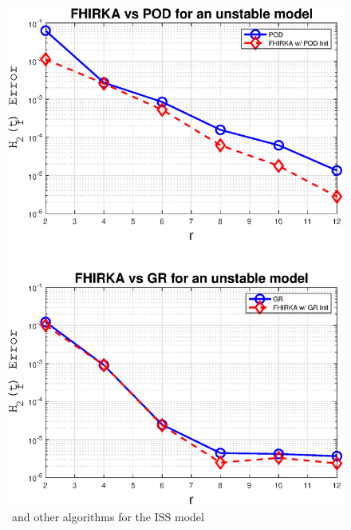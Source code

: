 \documentclass[twocolumn]{autart}
\begin{document}
  \begin{figure}[H]
 \centering
   \includegraphics [scale=0.35]{fig3u}
      \caption{\FH \ and other algorithms for the ISS model \label{fig:uns}}
 \end{figure}
 
\end{document}
